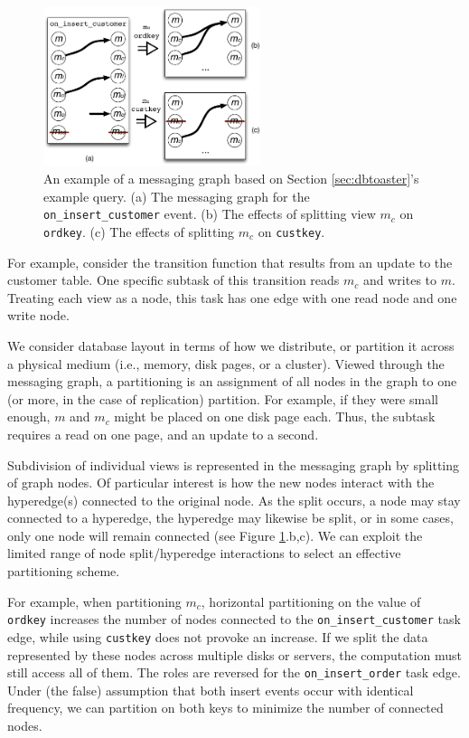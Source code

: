 \begin{figure}
\begin{center}
\includegraphics[width=2.5in]{graphics/MessagingGraph}
\end{center}
\caption{An example of a messaging graph based on Section \ref{sec:dbtoaster}'s example query.  (a) The messaging graph for the \texttt{on\_insert\_customer} event.  (b) The effects of splitting view $m_c$ on \texttt{ordkey}.  (c) The effects of splitting $m_c$ on \texttt{custkey}.}
\label{fig:diag:messagingGraph}
\vspace*{-0.2in}
\end{figure}

For example, consider the transition function that results from an update to the customer table.  One specific subtask of this transition reads $m_c$ and writes to $m$.  Treating each view as a node, this task has one edge with one read node and one write node.  

We consider database layout in terms of how we distribute, or partition it across a physical medium (i.e., memory, disk pages, or a cluster).  Viewed through the messaging graph, a partitioning is an assignment of all nodes in the graph to one (or more, in the case of replication) partition.  For example, if they were small enough, $m$ and $m_c$ might be placed on one disk page each.  Thus, the subtask requires a read on one page, and an update to a second.

Subdivision of individual views is represented in the messaging graph by splitting of graph nodes.  Of particular interest is how the new nodes interact with the hyperedge(s) connected to the original node.  As the split occurs, a node may stay connected to a hyperedge, the hyperedge may likewise be split, or in some cases, only one node will remain connected (see Figure \ref{fig:diag:messagingGraph}.b,c).  We can exploit the limited range of node split/hyperedge interactions to select an effective partitioning scheme.

For example, when partitioning $m_c$, horizontal partitioning on the value of \texttt{ordkey} increases the number of nodes connected to the \texttt{on\_insert\_customer} task edge, while using \texttt{custkey} does not provoke an increase.  If we split the data represented by these nodes across multiple disks or servers, the computation must still access all of them.  The roles are reversed for the \texttt{on\_insert\_order} task edge.  Under (the false) assumption that both insert events occur with identical frequency, we can partition on both keys to minimize the number of connected nodes.

